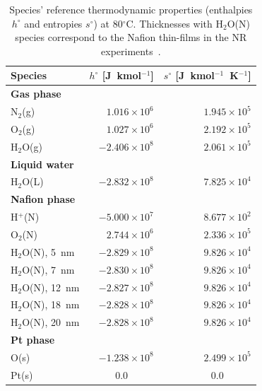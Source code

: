 \documentclass[final,3p,times,twocolumn]{elsarticle}    %
\begin{document}
\begin{table}[!t]
    \small
    \centering
    \caption{Species' reference thermodynamic properties (enthalpies $h^\circ$ and entropies $s^\circ$) at 80$^{\circ}$C. Thicknesses with H$_2$O(N) species correspond to the Nafion thin-films in the NR experiments~\cite{bib:decaluwe_2018}.}
    \vspace*{1mm}
    
    \begin{tabular}{l r r}
    \hline \hline 
    Species            &$h^\circ$ [J~kmol$^{-1}$]     &$s^\circ$ [J~kmol$^{-1}$~K$^{-1}$] \\
    \hline
    {\bf Gas phase}&&\\
    \hspace{7px}N$_2$(g)           &$1.016\times10^{6}$           &$1.945\times10^{5}$ \\
    \hspace{7px}O$_2$(g)           &$1.027\times10^{6}$           &$2.192\times10^{5}$ \\
    \hspace{7px}H$_2$O(g)          &$-2.406\times10^{8}$          &$2.061\times10^{5}$ \\
    {\bf Liquid water}&& \\
    \hspace{7px}H$_2$O(L)          &$-2.832\times10^{8}$          &$7.825\times10^{4}$ \\
    {\bf Nafion phase}&&\\
    \hspace{7px}H$^{+}$(N)         &$-5.000\times10^{7}$          &$8.677\times10^{2}$ \\
    \hspace{7px}O$_2$(N)           &$2.744\times10^{6}$           &$2.336\times10^{5}$ \\
    \hspace{7px}H$_2$O(N), 5~nm    &$-2.829\times10^{8}$          &$9.826\times10^{4}$ \\
    \hspace{7px}H$_2$O(N), 7~nm    &$-2.830\times10^{8}$          &$9.826\times10^{4}$ \\
    \hspace{7px}H$_2$O(N), 12~nm   &$-2.827\times10^{8}$          &$9.826\times10^{4}$ \\
    \hspace{7px}H$_2$O(N), 18~nm   &$-2.828\times10^{8}$          &$9.826\times10^{4}$ \\
    \hspace{7px}H$_2$O(N), 20~nm   &$-2.828\times10^{8}$          &$9.826\times10^{4}$ \\
    {\bf Pt phase}&&\\
    \hspace{7px}O(s)               &$-1.238\times10^{8}$          &$2.499\times10^{5}$ \\
    \hspace{7px}Pt(s)              &\multicolumn{1}{c}{$0.0$}     &\multicolumn{1}{c}{$\qquad0.0$} \\
    \hline \hline  
    \end{tabular}
    \label{tab:thermo}
\end{table}
\end{document}
